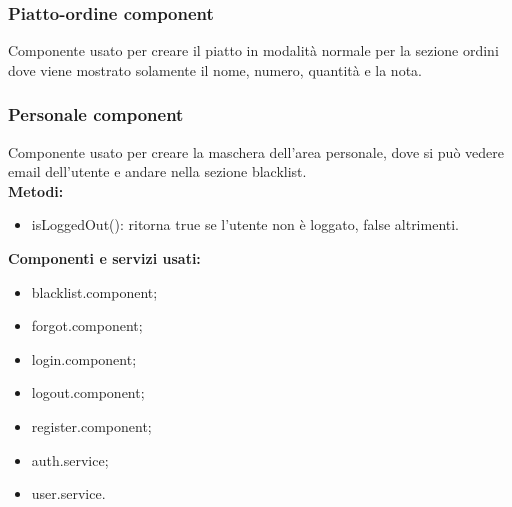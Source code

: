 
\subsubsection{Piatto-ordine component}
Componente usato per creare il piatto in modalità normale per la sezione ordini dove viene mostrato solamente il nome, numero, quantità e la nota.\\

\subsubsection{Personale component}
Componente usato per creare la maschera dell'area personale, dove si può vedere email dell'utente e andare nella sezione blacklist.\\
\textbf{Metodi:}
\begin{itemize}
    \item isLoggedOut(): ritorna true se l'utente non è loggato, false altrimenti.
\end{itemize}
\textbf{Componenti e servizi usati:}
\begin{itemize}
    \item blacklist.component;
    \item forgot.component;
    \item login.component;
    \item logout.component;
    \item register.component;
    \item auth.service;
    \item user.service.
\end{itemize}

